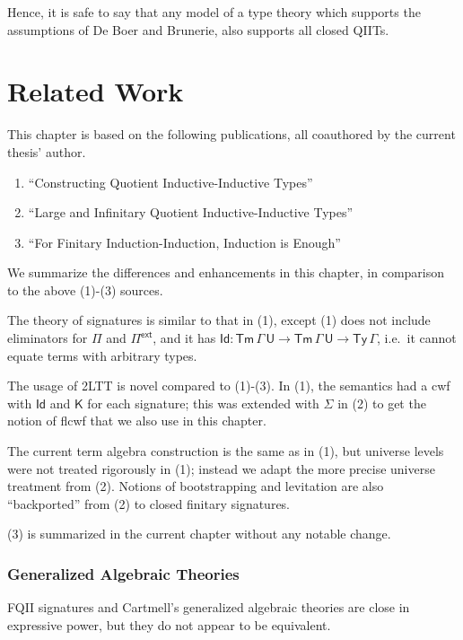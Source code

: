 \documentclass[12pt,a4paper,twoside,openany]{book}
\theoremstyle{remark}
\theoremstyle{definition}
\theoremstyle{theorem}
\newcommand{\Tm}{\mathsf{Tm}}
\newcommand{\Ty}{\mathsf{Ty}}
\newcommand{\U}{\mathsf{U}}
\newcommand{\Id}{\mathsf{Id}}
\newcommand{\Pie}{\Pi^{\mathsf{ext}}}
\newcommand{\K}{\mathsf{K}}
\begin{document}
Hence, it is safe to say that any model of a type theory which supports the
assumptions of De Boer and Brunerie, also supports all closed QIITs.

\section{Related Work}

This chapter is based on the following publications, all coauthored by the
current thesis' author.
\begin{enumerate}
  \item ``Constructing Quotient Inductive-Inductive Types'' \cite{kaposi2019constructing}
  \item ``Large and Infinitary Quotient Inductive-Inductive Types'' \cite{iqiit}
  \item ``For Finitary Induction-Induction, Induction is Enough'' \cite{ind-ind-reduction}
\end{enumerate}
We summarize the differences and enhancements in this chapter, in comparison to the above
(1)-(3) sources.

The theory of signatures is similar to that in (1), except (1) does not include
eliminators for $\Pi$ and $\Pie$, and it has $\Id : \Tm\,\Gamma\,\U \to
\Tm\,\Gamma\,\U \to \Ty\,\Gamma$, i.e.\ it cannot equate terms with arbitrary
types.

The usage of 2LTT is novel compared to (1)-(3). In (1), the semantics had a cwf
with $\Id$ and $\K$ for each signature; this was extended with $\Sigma$ in (2)
to get the notion of flcwf that we also use in this chapter.

The current term algebra construction is the same as in (1), but universe levels
were not treated rigorously in (1); instead we adapt the more precise universe
treatment from (2). Notions of bootstrapping and levitation are also
``backported'' from (2) to closed finitary signatures.

(3) is summarized in the current chapter without any notable change.

\subsubsection{Generalized Algebraic Theories}

FQII signatures and Cartmell's generalized algebraic theories \cite{gat} are
close in expressive power, but they do not appear to be equivalent.
\end{document}
